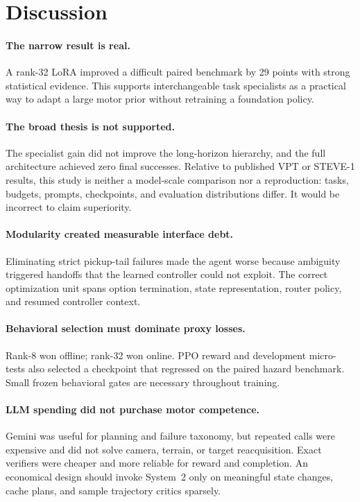 \documentclass[10pt,twocolumn]{article}
\begin{document}
\section{Discussion}
\paragraph{The narrow result is real.}
A rank-32 LoRA improved a difficult paired benchmark by 29 points with strong statistical evidence. This supports interchangeable task specialists as a practical way to adapt a large motor prior without retraining a foundation policy.

\paragraph{The broad thesis is not supported.}
The specialist gain did not improve the long-horizon hierarchy, and the full architecture achieved zero final successes. Relative to published VPT or STEVE-1 results, this study is neither a model-scale comparison nor a reproduction: tasks, budgets, prompts, checkpoints, and evaluation distributions differ. It would be incorrect to claim superiority.

\paragraph{Modularity created measurable interface debt.}
Eliminating strict pickup-tail failures made the agent worse because ambiguity triggered handoffs that the learned controller could not exploit. The correct optimization unit spans option termination, state representation, router policy, and resumed controller context.

\paragraph{Behavioral selection must dominate proxy losses.}
Rank-8 won offline; rank-32 won online. PPO reward and development micro-tests also selected a checkpoint that regressed on the paired hazard benchmark. Small frozen behavioral gates are necessary throughout training.

\paragraph{LLM spending did not purchase motor competence.}
Gemini was useful for planning and failure taxonomy, but repeated calls were expensive and did not solve camera, terrain, or target reacquisition. Exact verifiers were cheaper and more reliable for reward and completion. An economical design should invoke System~2 only on meaningful state changes, cache plans, and sample trajectory critics sparsely.
\end{document}
